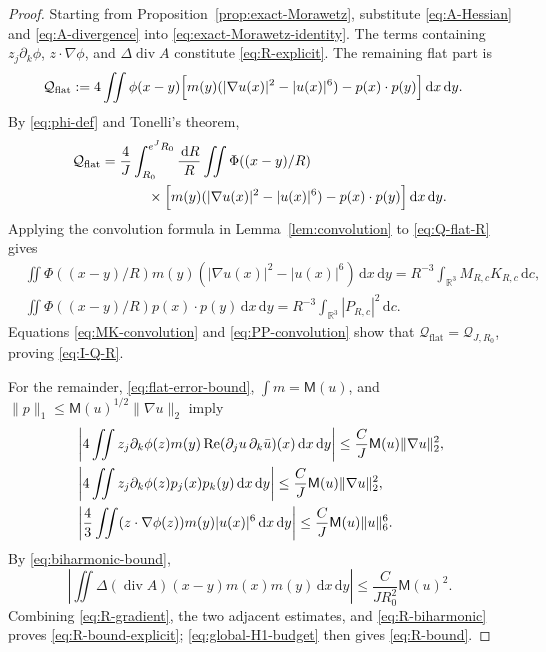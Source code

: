 \documentclass{interact}
\numberwithin{equation}{section}
\theoremstyle{plain}
\theoremstyle{definition}
\theoremstyle{remark}
\newcommand{\R}{\mathbb R}
\newcommand{\Rea}{\operatorname{Re}}
\newcommand{\M}{\mathsf M}
\newcommand{\dd}{\,\mathrm d}
\begin{document}
\begin{proof}
Starting from Proposition~\ref{prop:exact-Morawetz}, substitute \eqref{eq:A-Hessian} and \eqref{eq:A-divergence} into \eqref{eq:exact-Morawetz-identity}. The terms containing $z_j\partial_k\phi$, $z\cdot\nabla\phi$, and $\Delta\operatorname{div}A$ constitute \eqref{eq:R-explicit}. The remaining flat part is
\begin{align}
 \mathcal Q_{\mathrm{flat}}
 :={}&4\iint\phi(x-y)
 \Bigl[
 m(y)(|\nabla u(x)|^2-|u(x)|^6)
 -p(x)\cdot p(y)
 \Bigr]\dd x\dd y.
 \label{eq:Q-flat}
\end{align}
By \eqref{eq:phi-def} and Tonelli's theorem,
\begin{align}
 \mathcal Q_{\mathrm{flat}}
 ={}&\frac4J\int_{R_0}^{e^JR_0}\frac{\dd R}{R}
 \iint\Phi((x-y)/R)
 \notag\\
 &\qquad\times
 \Bigl[
 m(y)(|\nabla u(x)|^2-|u(x)|^6)
 -p(x)\cdot p(y)
 \Bigr]\dd x\dd y.
 \label{eq:Q-flat-R}
\end{align}
Applying the convolution formula in Lemma~\ref{lem:convolution} to \eqref{eq:Q-flat-R} gives
\begin{align}
 &\iint\Phi((x-y)/R)
 m(y)(|\nabla u(x)|^2-|u(x)|^6)\dd x\dd y
 =R^{-3}\int_{\R^3}M_{R,c}K_{R,c}\dd c,
 \label{eq:MK-convolution}\\
 &\iint\Phi((x-y)/R)p(x)\cdot p(y)\dd x\dd y
 =R^{-3}\int_{\R^3}|P_{R,c}|^2\dd c.
 \label{eq:PP-convolution}
\end{align}
Equations \eqref{eq:MK-convolution} and \eqref{eq:PP-convolution} show that $\mathcal Q_{\mathrm{flat}}=\mathcal Q_{J,R_0}$, proving \eqref{eq:I-Q-R}.

For the remainder, \eqref{eq:flat-error-bound}, $\int m=\M(u)$, and $\|p\|_1\le\M(u)^{1/2}\|\nabla u\|_2$ imply
\begin{align}
 &\left|4\iint z_j\partial_k\phi(z)
 m(y)\Rea(\partial_ju\,\partial_k\bar u)(x)\dd x\dd y\right|
 \le\frac{C}{J}\M(u)\|\nabla u\|_2^2,
 \label{eq:R-gradient}\\
 &\left|4\iint z_j\partial_k\phi(z)p_j(x)p_k(y)\dd x\dd y\right|
 \le\frac{C}{J}\M(u)\|\nabla u\|_2^2,\notag\\
 &\left|\frac43\iint(z\cdot\nabla\phi(z))m(y)|u(x)|^6\dd x\dd y\right|
 \le\frac{C}{J}\M(u)\|u\|_6^6.\notag
\end{align}
By \eqref{eq:biharmonic-bound},
\begin{equation}\label{eq:R-biharmonic}
 \left|\iint\Delta(\operatorname{div}A)(x-y)m(x)m(y)\dd x\dd y\right|
 \le\frac{C}{JR_0^2}\M(u)^2.
\end{equation}
Combining \eqref{eq:R-gradient}, the two adjacent estimates, and \eqref{eq:R-biharmonic} proves \eqref{eq:R-bound-explicit}; \eqref{eq:global-H1-budget} then gives \eqref{eq:R-bound}.
\end{proof}
\end{document}
